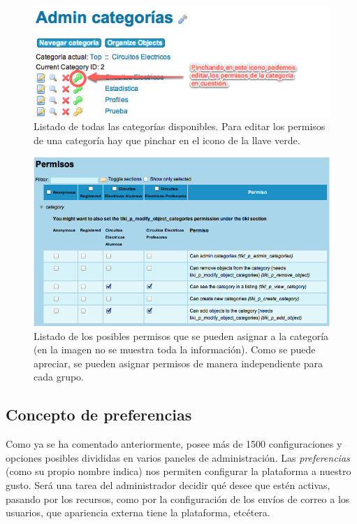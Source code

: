 \begin{figure}
\centering
\includegraphics[width=.8\linewidth]{../graphics/fig_asignacion_permisos_llave_verde.png}
\caption{Listado de todas las categorías disponibles. Para editar los permisos de una categoría hay que pinchar en el icono de la llave verde.}\label{fig:asignacion_permisos_llave_verde}
\end{figure}

\begin{figure}
\centering
\includegraphics[width=\linewidth]{../graphics/fig_asignacion_permisos_categoria.png}
\caption{Listado de los posibles permisos que se pueden asignar a la categoría (en la imagen no se muestra toda la información). Como se puede apreciar, se pueden asignar permisos de manera independiente para cada grupo.}\label{fig:asignacion_permisos_categoria}
\end{figure}

\subsection{Concepto de preferencias}
\label{section:concepto-preferencias}

Como ya se ha comentado anteriormente, \tiki{} posee más de 1500 configuraciones y opciones posibles divididas en varios paneles de administración. Las \textit{preferencias} (como su propio nombre indica) nos permiten  configurar la plataforma a nuestro gusto. Será una tarea del administrador decidir qué  desee que estén activas, pasando por los recursos, como por la configuración de los envíos de correo a los usuarios, que apariencia externa tiene la plataforma, etcétera.

